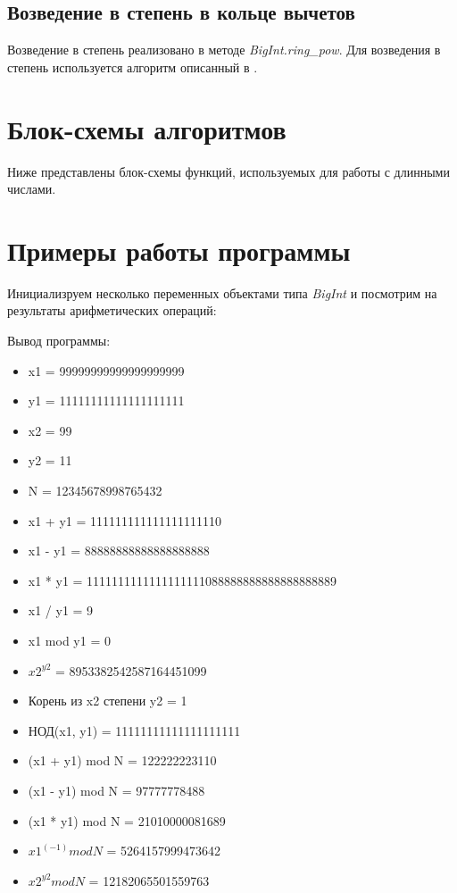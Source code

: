 \subsection{Возведение в степень в кольце вычетов}
Возведение в степень реализовано в методе \textit{BigInt.ring\_pow}. Для возведения в степень используется алгоритм описанный в \cite{zavg}.

\section{Блок-схемы алгоритмов}
Ниже представлены блок-схемы функций, используемых для работы с длинными числами.











\clearpage

\section{Примеры работы программы}

Инициализруем несколько переменных объектами типа \textit{BigInt} и посмотрим на результаты арифметических операций:



Вывод программы:
\begin{itemize}
    \item x1 = 99999999999999999999
    \item y1 = 11111111111111111111
    \item x2 = 99
    \item y2 = 11
    \item N = 12345678998765432
    \item x1 + y1 = 111111111111111111110
    \item x1 - y1 = 88888888888888888888
    \item x1 * y1 = 1111111111111111111088888888888888888889
    \item x1 / y1 = 9
    \item x1 mod y1 = 0
    \item $x2 ^{y2}$ = 8953382542587164451099
    \item Корень из x2 степени y2 = 1
    \item НОД(x1, y1) = 11111111111111111111
    \item (x1 + y1) mod N = 122222223110
    \item (x1 - y1) mod N = 97777778488
    \item (x1 * y1) mod N = 21010000081689
    \item $x1 ^{(-1)} mod N$ = 5264157999473642
    \item $x2 ^{y2} mod N$ = 12182065501559763
\end{itemize}

